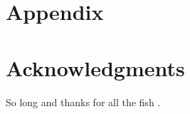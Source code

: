 \documentclass[fleqn,10pt]{SelfArx} %
\begin{document}
	\section{Appendix}
	\section*{Acknowledgments} %
	
	
	So long and thanks for all the fish \cite{Figueredo:2009dg}.
	
	
	
	
\end{document}
